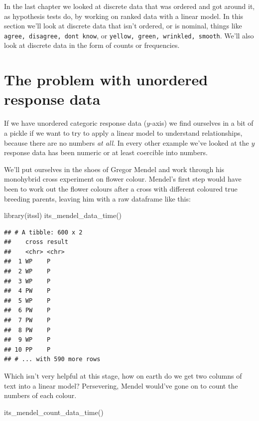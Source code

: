 \documentclass[
]{book}
\newenvironment{Shaded}{\begin{snugshade}}{\end{snugshade}}
\newcommand{\FunctionTok}[1]{\textcolor[rgb]{0.00,0.00,0.00}{#1}}
\newcommand{\NormalTok}[1]{#1}
\begin{document}
In the last chapter we looked at discrete data that was ordered and got around it, as hypothesis tests do, by working on ranked data with a linear model. In this section we'll look at discrete data that isn't ordered, or is nominal, things like \texttt{agree,\ disagree,\ don\textquotesingle{}t\ know}, or \texttt{yellow,\ green,\ wrinkled,\ smooth}. We'll also look at discrete data in the form of counts or frequencies.

\hypertarget{the-problem-with-unordered-response-data}{%
\section{The problem with unordered response data}\label{the-problem-with-unordered-response-data}}

If we have unordered categoric response data (\(y\)-axis) we find ourselves in a bit of a pickle if we want to try to apply a linear model to understand relationships, because there are no numbers \emph{at all}. In every other example we've looked at the \(y\) response data has been numeric or at least coercible into numbers.

We'll put ourselves in the shoes of Gregor Mendel and work through his monohybrid cross experiment on flower colour. Mendel's first step would have been to work out the flower colours after a cross with different coloured true breeding parents, leaving him with a raw dataframe like this:

\begin{Shaded}
\begin{Highlighting}[]
\FunctionTok{library}\NormalTok{(itssl)}
\FunctionTok{its\_mendel\_data\_time}\NormalTok{()}
\end{Highlighting}
\end{Shaded}

\begin{verbatim}
## # A tibble: 600 x 2
##    cross result
##    <chr> <chr> 
##  1 WP    P     
##  2 WP    P     
##  3 WP    P     
##  4 PW    P     
##  5 WP    P     
##  6 PW    P     
##  7 PW    P     
##  8 PW    P     
##  9 WP    P     
## 10 PP    P     
## # ... with 590 more rows
\end{verbatim}

Which isn't very helpful at this stage, how on earth do we get two columns of text into a linear model? Persevering, Mendel would've gone on to count the numbers of each colour.

\begin{Shaded}
\begin{Highlighting}[]
\FunctionTok{its\_mendel\_count\_data\_time}\NormalTok{()}
\end{Highlighting}
\end{Shaded}
\end{document}
